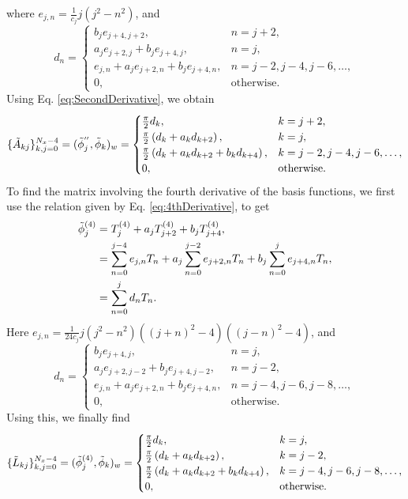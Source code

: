 where $e_{j,n} = \frac{1}{c_j}j(j^2-n^2)$, and
\begin{equation}
d_{n} = \begin{cases}
  b_j e_{j+4,j+2}, &n=j+2,\\
  a_j e_{j+2,j}+ b_j e_{j+4,j}, &n=j,\\
  e_{j,n} + a_j e_{j+2,n} + b_j e_{j+4,n}, &n= j-2, j-4, j-6, \ldots,\\
 0, &\text{otherwise}.
 \end{cases}
\end{equation}
Using Eq. \ref{eq:SecondDerivative}, we obtain
\begin{equation}
 \{\tilde{A}_{kj}\}_{k,j=0}^{N_x-4} = (\tilde{\phi}^{''}_j, \tilde{\phi}_k)_w = \begin{cases}
   \frac{\pi}{2} d_{k}, &k=j+2,\\
   \frac{\pi}{2} \left( d_{k}+ a_{k} d_{k+2} \right), &k=j,\\
   \frac{\pi}{2} \left( d_{k}+ a_{k} d_{k+2} + b_{k} d_{k+4} \right), &k= j-2, j-4, j-6,\ldots,\\
 0, &\text{otherwise}.
 \end{cases}
\end{equation}
To find the matrix involving the fourth derivative of the basis functions, we first use the relation given by Eq. \ref{eq:4thDerivative}, to get
\begin{align}
\tilde{\phi}^{(4)}_{j} &= T_j^{(4)} + a_j T_{j+2}^{(4)} + b_j T_{j+4}^{(4)},\nonumber\\
                           &=\sum_{n=0}^{j-4} e_{j,n} T_n + a_j\sum_{n=0}^{j-2} e_{j+2,n} T_n + b_j\sum_{n=0}^{j} e_{j+4, n} T_n,\nonumber\\
                           &= \sum_{n=0}^{j} d_{n} T_n.\label{eq:FourthDerivative}
\end{align} 
Here $e_{j,n} = \frac{1}{24 c_j}j(j^2-n^2)((j+n)^2 -4) ((j-n)^2 -4)$, and
\begin{equation}
d_{n} = \begin{cases}
  b_j e_{j+4,j}, &n=j,\\
  a_j e_{j+2,j-2}+ b_j e_{j+4,j-2}, &n=j-2,\\
  e_{j,n} + a_j e_{j+2,n} + b_j e_{j+4,n}, &n= j-4, j-6, j-8, \ldots,\\
 0, &\text{otherwise}.
 \end{cases}
\end{equation}
Using this, we finally find
\begin{equation}
 \{\tilde{L}_{kj}\}_{k,j=0}^{N_x-4} = (\tilde{\phi}^{(4)}_j, \tilde{\phi}_k)_w = \begin{cases}
   \frac{\pi}{2} d_{k}, &k=j,\\
   \frac{\pi}{2} \left( d_{k}+ a_{k} d_{k+2} \right), &k=j-2,\\
   \frac{\pi}{2} \left( d_{k}+ a_{k} d_{k+2} + b_{k} d_{k+4} \right), &k= j-4, j-6, j-8,\ldots,\\
 0, &\text{otherwise}.
 \end{cases}
\end{equation}








